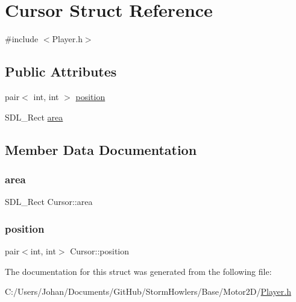 \hypertarget{struct_cursor}{}\section{Cursor Struct Reference}
\label{struct_cursor}


{\ttfamily \#include $<$Player.\+h$>$}

\subsection*{Public Attributes}
\begin{DoxyCompactItemize}
\item 
pair$<$ int, int $>$ \mbox{\hyperlink{struct_cursor_a3a367bb7f29a085bb1de04e6963e3cb5}{position}}
\item 
S\+D\+L\+\_\+\+Rect \mbox{\hyperlink{struct_cursor_a7a6e98c3f3b083161960bfa8532a598c}{area}}
\end{DoxyCompactItemize}


\subsection{Member Data Documentation}
\mbox{\label{struct_cursor_a7a6e98c3f3b083161960bfa8532a598c}} 
\subsubsection{\texorpdfstring{area}{area}}
{\footnotesize\ttfamily S\+D\+L\+\_\+\+Rect Cursor\+::area}

\mbox{\label{struct_cursor_a3a367bb7f29a085bb1de04e6963e3cb5}} 
\subsubsection{\texorpdfstring{position}{position}}
{\footnotesize\ttfamily pair$<$int, int$>$ Cursor\+::position}



The documentation for this struct was generated from the following file\+:\begin{DoxyCompactItemize}
\item 
C\+:/\+Users/\+Johan/\+Documents/\+Git\+Hub/\+Storm\+Howlers/\+Base/\+Motor2\+D/\mbox{\hyperlink{_player_8h}{Player.\+h}}\end{DoxyCompactItemize}
